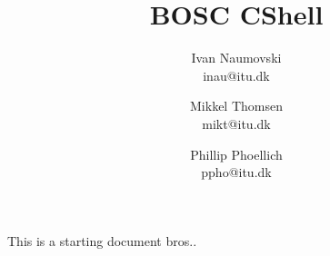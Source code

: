 \documentclass[pdftex,12pt,a4paper]{report}
\begin{document}
\title{BOSC CShell}
\date{}
\author{Ivan Naumovski\\ inau@itu.dk
        \and Mikkel Thomsen\\ mikt@itu.dk \and Phillip Phoellich\\ ppho@itu.dk}

\maketitle

\tableofcontents

This is a starting document bros..






\end{document}
